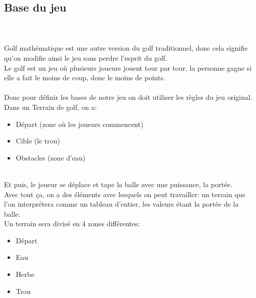 \documentclass{article}
\begin{document}
\subsection{Base du jeu}
~\\~\\
Golf mathématique est une autre version du golf traditionnel, donc cela signifie qu'on modifie ainsi le jeu sans perdre l'esprit du golf.\\
Le golf est un jeu où plusieurs joueurs jouent tour par tour, la personne gagne si elle a fait le moins de coup, donc le moins de points.\\~\\
Donc pour définir les bases de notre jeu on doit utiliser les règles du jeu original.
Dans un Terrain de golf, on a:
\begin{itemize}
\item Départ (zone où les joueurs commencent)
\item Cible (le trou)
\item Obstacles (zone d'eau)
\end{itemize}
~\\
Et puis, le joueur se déplace et tape la balle avec une puissance, la portée.\\
Avec tout ça, on a des éléments avec lesquels on peut travailler: un terrain que l'on interprétera comme un tableau d'entier, les valeurs étant la portée de la balle.\\
Un terrain sera divisé en 4 zones différentes:
\begin{itemize}
\item Départ
\item Eau
\item Herbe
\item Trou
\end{itemize}
\newpage
\end{document}
